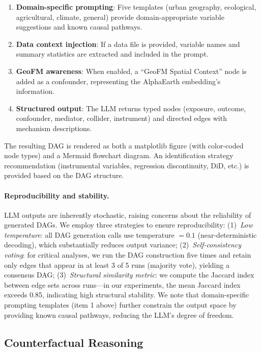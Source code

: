 \documentclass{article}
\begin{document}
\begin{enumerate}
\item \textbf{Domain-specific prompting}: Five templates (urban geography, ecological, agricultural, climate, general) provide domain-appropriate variable suggestions and known causal pathways.
\item \textbf{Data context injection}: If a data file is provided, variable names and summary statistics are extracted and included in the prompt.
\item \textbf{GeoFM awareness}: When enabled, a ``GeoFM Spatial Context'' node is added as a confounder, representing the AlphaEarth embedding's information.
\item \textbf{Structured output}: The LLM returns typed nodes (exposure, outcome, confounder, mediator, collider, instrument) and directed edges with mechanism descriptions.
\end{enumerate}

The resulting DAG is rendered as both a matplotlib figure (with color-coded node types) and a Mermaid flowchart diagram. An identification strategy recommendation (instrumental variables, regression discontinuity, DiD, etc.) is provided based on the DAG structure.

\paragraph{Reproducibility and stability.} LLM outputs are inherently stochastic, raising concerns about the reliability of generated DAGs. We employ three strategies to ensure reproducibility: (1)~\textit{Low temperature}: all DAG generation calls use temperature $= 0.1$ (near-deterministic decoding), which substantially reduces output variance; (2)~\textit{Self-consistency voting}: for critical analyses, we run the DAG construction five times and retain only edges that appear in at least 3 of 5 runs (majority vote), yielding a consensus DAG; (3)~\textit{Structural similarity metric}: we compute the Jaccard index between edge sets across runs---in our experiments, the mean Jaccard index exceeds 0.85, indicating high structural stability. We note that domain-specific prompting templates (item 1 above) further constrain the output space by providing known causal pathways, reducing the LLM's degree of freedom.

\subsection{Counterfactual Reasoning}
\end{document}
